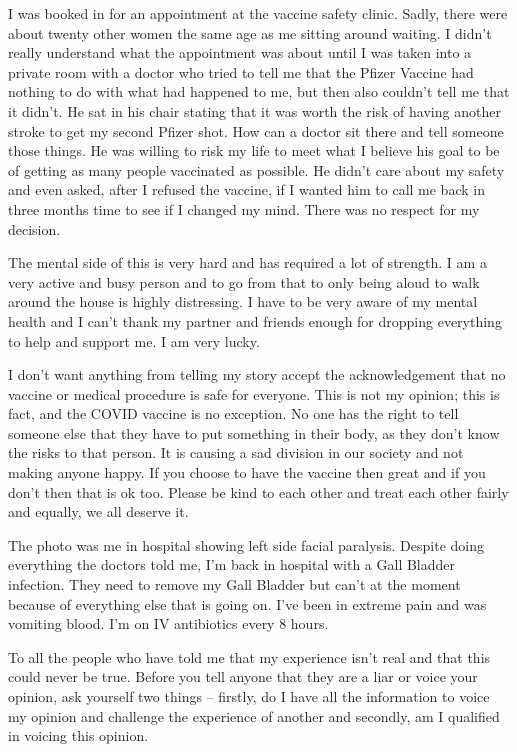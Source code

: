 I was booked in for an appointment at the vaccine safety clinic. Sadly, there
were about twenty other women the same age as me sitting around waiting. I
didn’t really understand what the appointment was about until I was taken into a
private room with a doctor who tried to tell me that the Pfizer Vaccine had
nothing to do with what had happened to me, but then also couldn’t tell me that
it didn’t. He sat in his chair stating that it was worth the risk of having
another stroke to get my second Pfizer shot. How can a doctor sit there and tell
someone those things. He was willing to risk my life to meet what I believe his
goal to be of getting as many people vaccinated as possible. He didn’t care
about my safety and even asked, after I refused the vaccine, if I wanted him to
call me back in three months time to see if I changed my mind. There was no
respect for my decision.

The mental side of this is very hard and has required a lot of strength. I am a
very active and busy person and to go from that to only being aloud to walk
around the house is highly distressing. I have to be very aware of my mental
health and I can’t thank my partner and friends enough for dropping everything
to help and support me. I am very lucky.

I don’t want anything from telling my story accept the acknowledgement that no
vaccine or medical procedure is safe for everyone. This is not my opinion; this
is fact, and the COVID vaccine is no exception. No one has the right to tell
someone else that they have to put something in their body, as they don’t know
the risks to that person. It is causing a sad division in our society and not
making anyone happy. If you choose to have the vaccine then great and if you
don’t then that is ok too. Please be kind to each other and treat each other
fairly and equally, we all deserve it.

The photo was me in hospital showing left side facial paralysis. Despite doing
everything the doctors told me, I’m back in hospital with a Gall Bladder
infection. They need to remove my Gall Bladder but can’t at the moment because
of everything else that is going on. I’ve been in extreme pain and was vomiting
blood. I’m on IV antibiotics every 8 hours.

To all the people who have told me that my experience isn’t real and that this
could never be true. Before you tell anyone that they are a liar or voice your
opinion, ask yourself two things – firstly, do I have all the information to
voice my opinion and challenge the experience of another and secondly, am I
qualified in voicing this opinion.
